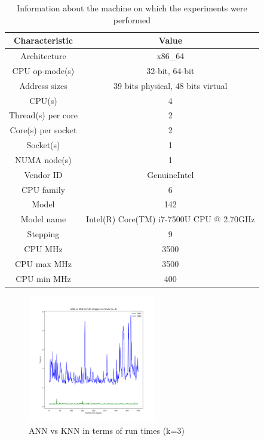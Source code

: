 \begin{table}[H]
    \centering
    \begin{tabular}{c|c}
        Characteristic & Value \\
        \hline
        Architecture &                    x86\_64 \\
        CPU op-mode(s) &                  32-bit, 64-bit \\
        Address sizes &                   39 bits physical, 48 bits virtual \\
        CPU(s)&                          4 \\
        Thread(s) per core &              2 \\
        Core(s) per socket&              2 \\
        Socket(s)&                       1 \\
        NUMA node(s)&                    1 \\
        Vendor ID&                       GenuineIntel \\
        CPU family&                      6 \\
        Model&                           142 \\
        Model name&                      Intel(R) Core(TM) i7-7500U CPU @ 2.70GHz \\
        Stepping&                        9 \\
        CPU MHz&                         3500 \\
        CPU max MHz&                     3500 \\
        CPU min MHz&                     400 \\
    \end{tabular}
    \caption{Information about the machine on which the experiments were performed}
    \label{tab:environment-knn-vs-ann}
\end{table}


\begin{figure}[H]
    \centering
    \includegraphics[width = 0.5\textwidth]{assets/evaluation_results/ANN_vs_KNN_run_time.png}
    \caption{ANN vs KNN in terms of run times (k=3)}
    \label{fig:ann-vs-knn-run-times}
\end{figure}



